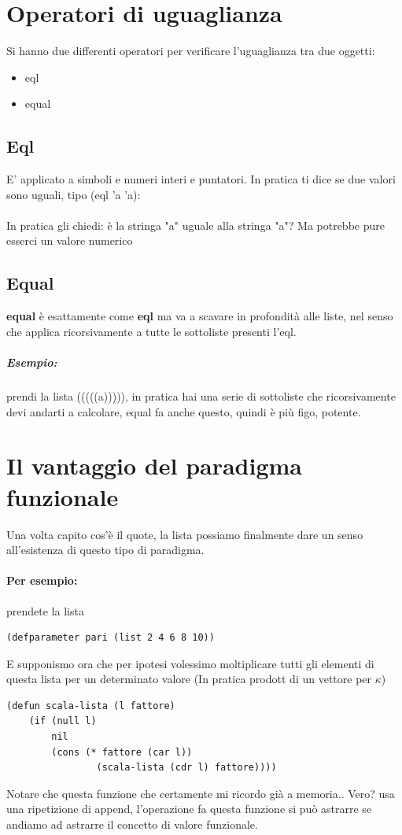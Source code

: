 \documentclass[12pt, a4paper, openany, oneside]{book}
\begin{document}
\section{Operatori di uguaglianza}
Si hanno due differenti operatori per verificare l'uguaglianza tra due oggetti:
\begin{itemize}
	\item eql
	\item equal
\end{itemize}
\subsection{Eql}
E' applicato a simboli e numeri interi e puntatori. In pratica ti dice
se due valori sono uguali, tipo (eql 'a 'a):
\paragraph{}In pratica gli chiedi: è la stringa "a" uguale alla stringa "a"? 
Ma potrebbe pure esserci un valore numerico
\subsection{Equal} \textbf{equal} è esattamente come \textbf{eql} ma va 
a scavare in profondità alle liste, nel senso che applica ricorsivamente a tutte 
le sottoliste presenti l'eql. 
\subparagraph{Esempio: }prendi la lista (((((a))))), in pratica hai una serie di 
sottoliste che ricorsivamente devi andarti a calcolare, equal fa anche questo, 
quindi è più figo, potente.
\section{Il vantaggio del paradigma funzionale}
Una volta capito cos'è il quote, la lista possiamo finalmente dare un senso 
all'esistenza di questo tipo di paradigma. 
\paragraph{Per esempio: }prendete la lista 
\begin{lstlisting}[language=LISP]
(defparameter pari (list 2 4 6 8 10))
\end{lstlisting}
E supponismo ora che per ipotesi volessimo moltiplicare tutti gli 
elementi di questa lista per un determinato valore (In pratica prodott di un 
vettore per $\kappa$)
\begin{lstlisting}[language=LISP]
(defun scala-lista (l fattore) 
	(if (null l)
		nil
		(cons (* fattore (car l))
				(scala-lista (cdr l) fattore))))	
\end{lstlisting}
Notare che questa funzione che certamente mi ricordo già a memoria.. Vero? usa
una ripetizione di append, l'operazione fa questa funzione si può astrarre se 
andiamo ad astrarre il concetto di valore funzionale.
\end{document}
